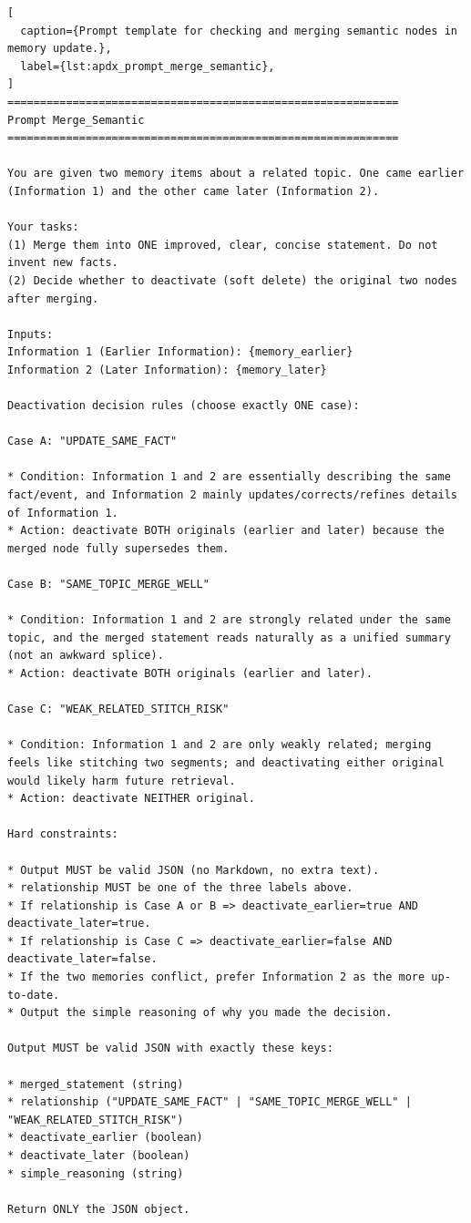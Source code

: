 \begin{lstlisting}[
  caption={Prompt template for checking and merging semantic nodes in memory update.},
  label={lst:apdx_prompt_merge_semantic},
]
============================================================
Prompt Merge_Semantic
============================================================

You are given two memory items about a related topic. One came earlier (Information 1) and the other came later (Information 2).

Your tasks:
(1) Merge them into ONE improved, clear, concise statement. Do not invent new facts.
(2) Decide whether to deactivate (soft delete) the original two nodes after merging.

Inputs:
Information 1 (Earlier Information): {memory_earlier}
Information 2 (Later Information): {memory_later}

Deactivation decision rules (choose exactly ONE case):

Case A: "UPDATE_SAME_FACT"

* Condition: Information 1 and 2 are essentially describing the same fact/event, and Information 2 mainly updates/corrects/refines details of Information 1.
* Action: deactivate BOTH originals (earlier and later) because the merged node fully supersedes them.

Case B: "SAME_TOPIC_MERGE_WELL"

* Condition: Information 1 and 2 are strongly related under the same topic, and the merged statement reads naturally as a unified summary (not an awkward splice).
* Action: deactivate BOTH originals (earlier and later).

Case C: "WEAK_RELATED_STITCH_RISK"

* Condition: Information 1 and 2 are only weakly related; merging feels like stitching two segments; and deactivating either original would likely harm future retrieval.
* Action: deactivate NEITHER original.

Hard constraints:

* Output MUST be valid JSON (no Markdown, no extra text).
* relationship MUST be one of the three labels above.
* If relationship is Case A or B => deactivate_earlier=true AND deactivate_later=true.
* If relationship is Case C => deactivate_earlier=false AND deactivate_later=false.
* If the two memories conflict, prefer Information 2 as the more up-to-date.
* Output the simple reasoning of why you made the decision.

Output MUST be valid JSON with exactly these keys:

* merged_statement (string)
* relationship ("UPDATE_SAME_FACT" | "SAME_TOPIC_MERGE_WELL" | "WEAK_RELATED_STITCH_RISK")
* deactivate_earlier (boolean)
* deactivate_later (boolean)
* simple_reasoning (string)

Return ONLY the JSON object.
\end{lstlisting}



